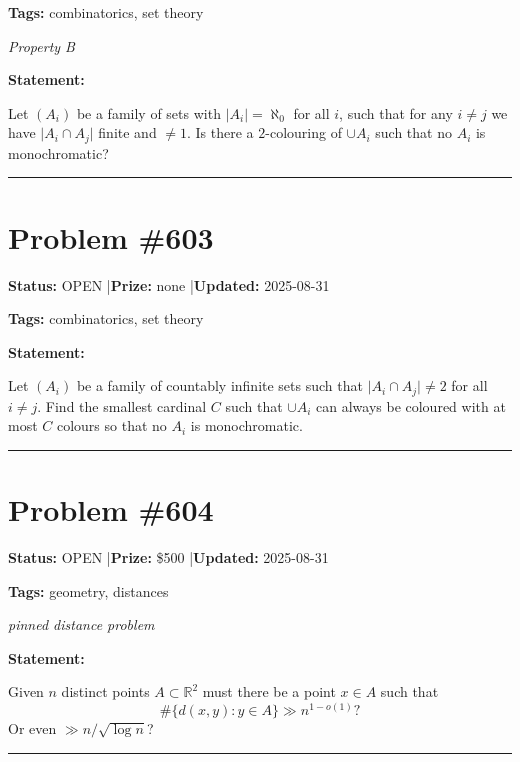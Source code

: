 \documentclass{article}
\begin{document}
\noindent\textbf{Tags:} combinatorics, set theory

\medskip
\noindent\textit{Property B}


\noindent\textbf{Statement:}

Let $(A_i)$ be a family of sets with $\lvert A_i\rvert=\aleph_0$ for all $i$, such that for any $i\neq j$ we have $\lvert A_i\cap A_j\rvert$ finite and $\neq 1$. Is there a $2$-colouring of $\cup A_i$ such that no $A_i$ is monochromatic?

\noindent\rule{\linewidth}{0.4pt}


\section{Problem \#603}
\label{prob:603}

\noindent\textbf{Status:} OPEN \quad|\quad \textbf{Prize:} none \quad|\quad \textbf{Updated:} 2025-08-31

\noindent\textbf{Tags:} combinatorics, set theory

\medskip

\noindent\textbf{Statement:}

Let $(A_i)$ be a family of countably infinite sets such that $\lvert A_i\cap A_j\rvert \neq 2$ for all $i\neq j$. Find the smallest cardinal $C$ such that $\cup A_i$ can always be coloured with at most $C$ colours so that no $A_i$ is monochromatic.

\noindent\rule{\linewidth}{0.4pt}


\section{Problem \#604}
\label{prob:604}

\noindent\textbf{Status:} OPEN \quad|\quad \textbf{Prize:} \$500 \quad|\quad \textbf{Updated:} 2025-08-31

\noindent\textbf{Tags:} geometry, distances

\medskip
\noindent\textit{pinned distance problem}


\noindent\textbf{Statement:}

Given $n$ distinct points $A\subset\mathbb{R}^2$ must there be a point $x\in A$ such that\[\#\{ d(x,y) : y \in A\} \gg n^{1-o(1)}?\]Or even $\gg n/\sqrt{\log n}$?

\noindent\rule{\linewidth}{0.4pt}
\end{document}
